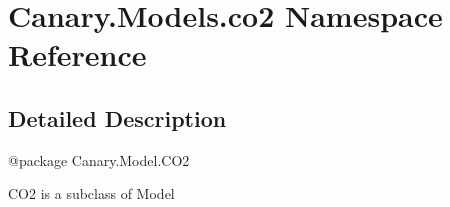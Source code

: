 \hypertarget{namespace_canary_1_1_models_1_1co2}{\section{Canary.\-Models.\-co2 Namespace Reference}
\label{namespace_canary_1_1_models_1_1co2}
}


\subsection{Detailed Description}
\begin{DoxyVerb}@package Canary.Model.CO2

CO2 is a subclass of Model
\end{DoxyVerb}
 